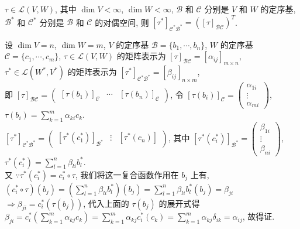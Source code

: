 \documentclass{note}
\begin{document}
\begin{thm}[(课本定理 3.22)]
    $\tau\in\mathcal{L}(V,W)$, 其中 $\dim V<\infty$, $\dim W<\infty$, $\mathcal{B}$ 和 $\mathcal{C}$ 分别是 $V$ 和 $W$ 的定序基, $\mathcal{B}^*$ 和 $\mathcal{C}^*$ 分别是 $\mathcal{B}$ 和 $\mathcal{C}$ 的对偶空间, 则 $[\tau^*]_{\mathcal{C}^*\mathcal{B}^*}=([\tau]_{\mathcal{BC}})^T$.
\end{thm}
\begin{pf}
    设 $\dim V=n$, $\dim W=m$, $V$ 的定序基 $\mathcal{B}=\{b_1,\cdots,b_n\}$, $W$ 的定序基 $\mathcal{C}=\{c_1,\cdots,c_m\}$, $\tau\in\mathcal{L}(V,W)$ 的矩阵表示为 $[\tau]_{\mathcal{BC}}=[\alpha_{ij}]_{m\times n}$, $\tau^*\in\mathcal{L}(W^*,V^*)$ 的矩阵表示为 $[\tau^*]_{\mathcal{C}^*\mathcal{B}^*}=[\beta_{ij}]_{n\times m}$,\\
    即 $[\tau]_{\mathcal{BC}}=\begin{pmatrix}
        [\tau(b_1)]_{\mathcal{C}}&\cdots&[\tau(b_n)]_{\mathcal{C}}
    \end{pmatrix}$, 令 $[\tau(b_i)]_{\mathcal{C}}=\begin{pmatrix}
        \alpha_{1i}\\
        \vdots\\
        \alpha_{mi}
    \end{pmatrix}$, $\tau(b_i)=\sum_{k=1}^m\alpha_{ki}c_k$.\\
    $[\tau^*]_{\mathcal{C}^*\mathcal{B}^*}=\begin{pmatrix}
        [\tau^*(c_1^*)]_{\mathcal{B^*}}&\vdots&[\tau^*(c_n)]
    \end{pmatrix}$, 其中 $[\tau^*(c_i^*)]_{\mathcal{B}^*}=\begin{pmatrix}
        \beta_{1i}\\
        \vdots\\
        \beta_{ni}
    \end{pmatrix}$, $\tau^*(c_i^*)=\sum_{l=1}^n\beta_{li}b_l^*$.\\
    又 $\because\tau^*(c_i^*)=c_i^*\circ\tau$, 我们将这一复合函数作用在 $b_j$ 上有, $(c_i^*\circ\tau)(b_j)=\left(\sum_{l=1}^n\beta_{li}b_l^*\right)(b_j)=\sum_{l=1}^n\beta_{li}b_l^*(b_j)=\beta_{ji}$\\
    $\Longrightarrow\beta_{ji}=c_i^*(\tau(b_j))$, 代入上面的 $\tau(b_j)$ 的展开式得 $\beta_{ji}=c_i^*\left(\sum_{k=1}^m\alpha_{kj}c_k\right)=\sum_{k=1}^m\alpha_{kj}c_i^*(c_k)=\sum_{k=1}^m\alpha_{kj}\delta_{ik}=\alpha_{ij}$, 故得证.
\end{pf}
\ifx\allfiles\undefined
\end{document}
